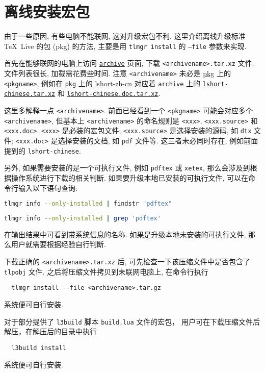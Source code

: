 
\chapter{离线安装宏包}

由于一些原因,
有些电脑不能联网,
这对升级宏包不利.
这里介绍离线升级标准 \TeX\ Live 的包 (pkg) 的方法,
主要是用 \texttt{tlmgr install} 的 \texttt{--file} 参数来实现.

首先在能够联网的电脑上访问
\href{https://ctan.org/tex-archive/systems/texlive/tlnet/archive}{\texttt{archive}}
页面, 下载 \texttt{<archivename>.tar.xz} 文件.
文件列表很长, 加载需花费些时间.
注意 \texttt{<archivename>} 未必是 \href{https://ctan.org/pkg/}{pkg} 上的 \texttt{<pkgname>},
例如在 \texttt{pkg} 上的
\href{https://ctan.org/pkg/lshort-zh-cn}{lshort-zh-cn}
对应着 \texttt{archive} 上的
\href{http://mirrors.ctan.org/systems/texlive/tlnet/archive/lshort-chinese.tar.xz}{\texttt{lshort-chinese.tar.xz}}
和
\href{http://mirrors.ctan.org/systems/texlive/tlnet/archive/lshort-chinese.doc.tar.xz}{\texttt{lshort-chinese.doc.tar.xz}}.

这里多解释一点 \texttt{<archivename>}.
前面已经看到一个 \texttt{<pkgname>} 可能会对应多个 \texttt{<archivename>},
但基本上 \texttt{<archivename>} 的命名规则是 \texttt{<xxx>},
\texttt{<xxx.source>} 和 \texttt{<xxx.doc>}.
\texttt{<xxx>} 是必装的宏包文件;
\texttt{<xxx.source>} 是选择安装的源码, 如 \texttt{dtx} 文件;
\texttt{<xxx.doc>} 是选择安装的文档, 如 \texttt{pdf} 文件等.
这三者未必同时存在, 例如前面提到的 \texttt{lshort-chinese}.

另外, 如果需要安装的是一个可执行文件, 例如 \texttt{pdftex} 或 \texttt{xetex},
那么会涉及到根据操作系统进行下载的相关判断.
如果要升级本地已安装的可执行文件, 可以在命令行输入以下语句查询:
\begin{lstlisting}[language=bash, title={\small\sffamily Windows 系统}]
  tlmgr info --only-installed | findstr "pdftex"
\end{lstlisting}
\begin{lstlisting}[language=bash, title={\small\sffamily Ubuntu 和 Mac 系统}]
  tlmgr info --only-installed | grep 'pdftex'
\end{lstlisting}
在输出结果中可看到带系统信息的名称.
如果是升级本地未安装的可执行文件,
那么用户就需要根据经验自行判断.

下载正确的 \texttt{<archivename>.tar.xz} 后,
可先检查一下该压缩文件中是否包含了 \texttt{tlpobj} 文件.
之后将压缩文件拷贝到未联网电脑上,
在命令行执行
\begin{lstlisting} 
  tlmgr install --file <archivename>.tar.gz 
\end{lstlisting}
系统便可自行安装.

对于部分提供了 \texttt{l3build} 脚本 \texttt{build.lua} 文件的宏包，
用户可在下载压缩文件后解压，在解压后的目录中执行
\begin{lstlisting} 
  l3build install
\end{lstlisting}
系统便可自行安装.
